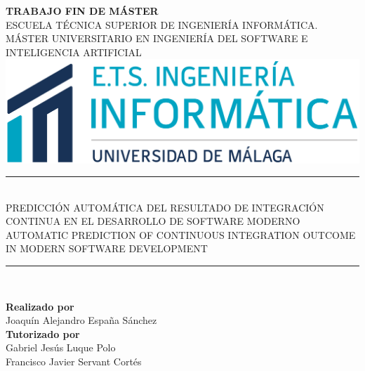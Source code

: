 \begin{titlepage}
\newlength{\centeroffset}
\setlength{\centeroffset}{-0.5\oddsidemargin}
\addtolength{\centeroffset}{0.5\evensidemargin}
\thispagestyle{empty}


\noindent\hspace*{-0.1\textwidth}
\begin{minipage}{1.2\textwidth}

\centering
\textbf{\Large TRABAJO FIN DE MÁSTER}\\[1cm]
\textsc{ESCUELA TÉCNICA SUPERIOR DE INGENIERÍA INFORMÁTICA.}\\[0.5cm]
\textsc{MÁSTER UNIVERSITARIO EN INGENIERÍA DEL SOFTWARE E INTELIGENCIA ARTIFICIAL}\\[0.5cm]

\includegraphics[width=1\textwidth]{logos/COLOR_TRANSPARENTE_INFORMATICA.png}\\[0.5cm]

\noindent\rule[-1ex]{\textwidth}{1pt}\\
\textsc{PREDICCIÓN AUTOMÁTICA DEL RESULTADO DE INTEGRACIÓN CONTINUA EN EL DESARROLLO DE SOFTWARE MODERNO}\\[0.5cm]

\textsc{AUTOMATIC PREDICTION OF CONTINUOUS INTEGRATION OUTCOME IN MODERN SOFTWARE DEVELOPMENT}\\
\vspace{-2.5ex}
\noindent\rule[-1ex]{\textwidth}{1pt}\\

\end{minipage}

\vspace{0.8cm}
\noindent\hspace*{\centeroffset}
\begin{minipage}{\textwidth}

\centering
\textbf{Realizado por}\\ {Joaquín Alejandro España Sánchez}\\[2.5ex]
\textbf{Tutorizado por}\\ {Gabriel Jesús Luque Polo}\\ {Francisco Javier Servant Cortés}\\[1cm]


\end{minipage}
\end{titlepage}
